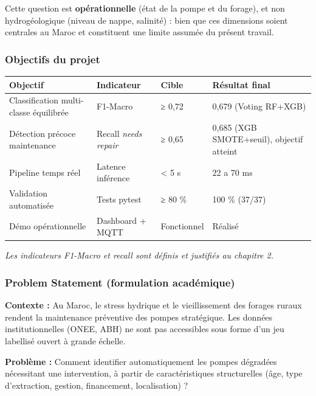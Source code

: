 \documentclass[11pt,a4paper]{report}
\begin{document}
Cette question est \textbf{opérationnelle} (état de la pompe et du forage), et non hydrogéologique (niveau de nappe, salinité) : bien que ces dimensions soient centrales au Maroc et constituent une limite assumée du présent travail.



\subsubsection{Objectifs du projet}



\begin{longtable}{@{}llll@{}}
\toprule
Objectif & Indicateur & Cible & Résultat final \\
\midrule
Classification multi-classe équilibrée & F1-Macro & ≥ 0,72 & 0,679 (Voting RF+XGB) \\
Détection précoce maintenance & Recall \textit{needs repair} & ≥ 0,65 & 0,685 (XGB SMOTE+seuil), objectif atteint \\
Pipeline temps réel & Latence inférence & < 5 s & 22 a 70 ms \\
Validation automatisée & Tests pytest & ≥ 80 \% & 100 \% (37/37) \\
Démo opérationnelle & Dashboard + MQTT & Fonctionnel & Réalisé \\
\bottomrule
\end{longtable}




\textit{Les indicateurs F1-Macro et recall sont définis et justifiés au chapitre 2.}



\subsubsection{Problem Statement (formulation académique)}



\textbf{Contexte :} Au Maroc, le stress hydrique et le vieillissement des forages ruraux rendent la maintenance préventive des pompes stratégique. Les données institutionnelles (ONEE, ABH) ne sont pas accessibles sous forme d'un jeu labellisé ouvert à grande échelle.



\textbf{Problème :} Comment identifier automatiquement les pompes dégradées nécessitant une intervention, à partir de caractéristiques structurelles (âge, type d'extraction, gestion, financement, localisation) ?
\end{document}
